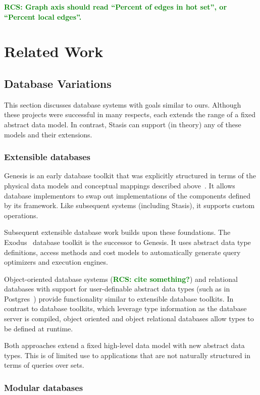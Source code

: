 \documentclass[letterpaper,twocolumn,10pt]{article}
\newcommand{\yad}{Stasis\xspace}
\newcommand{\rcs}[1]{\textcolor{green}{\bf RCS: #1}}
\begin{document}
\rcs{Graph axis should read ``Percent of edges in hot set'', or
``Percent local edges''.}

\section{Related Work}
\label{sec:related-work}

\subsection{Database Variations} 
\label{sec:otherDBs}

This section discusses database systems with goals similar to ours.
Although these projects were successful in many respects, each extends
the range of a fixed abstract data model.  In contrast, \yad can
support (in theory) any of these models and their extensions.

\subsubsection{Extensible databases}

Genesis is an early database toolkit that was explicitly structured in
terms of the physical data models and conceptual mappings described
above~\cite{genesis}.  It allows database implementors to swap out
implementations of the components defined by its framework.  Like
subsequent systems (including \yad), it supports custom operations.

Subsequent extensible database work builds upon these foundations.
The Exodus~\cite{exodus} database toolkit is the successor to
Genesis. It uses abstract data type definitions, access methods and
cost models to automatically generate query optimizers and execution
engines.

Object-oriented database systems (\rcs{cite something?}) and
relational databases with support for user-definable abstract data
types (such as in Postgres~\cite{postgres}) provide functionality
similar to extensible database toolkits.  In contrast to database toolkits,
which leverage type information as the database server is compiled, object
oriented and object relational databases allow types to be defined at
runtime.

Both approaches extend a fixed high-level data model with new
abstract data types.  This is of limited use to applications that are
not naturally structured in terms of queries over sets.

\subsubsection{Modular databases}
\end{document}
